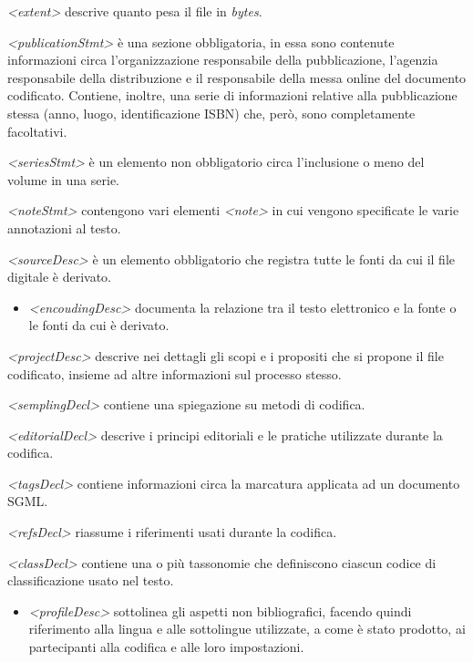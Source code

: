 \documentclass[
  b5paper,
  twoside,
  11pt,
  chapterprefix=false,
  bibliography=totocnumbered,
  listof=flat]{scrbook}
\providecommand{\tightlist}{%
  \setlength{\itemsep}{0pt}\setlength{\parskip}{0pt}}
\begin{document}
\emph{\textless extent\textgreater{}} descrive quanto pesa il file in \emph{bytes}.

\emph{\textless publicationStmt\textgreater{}} è una sezione obbligatoria, in essa sono contenute
informazioni circa l'organizzazione responsabile della pubblicazione,
l'agenzia responsabile della distribuzione e il responsabile della messa
online del documento codificato. Contiene, inoltre, una serie di
informazioni relative alla pubblicazione stessa (anno, luogo,
identificazione ISBN) che, però, sono completamente facoltativi.

\emph{\textless seriesStmt\textgreater{}} è un elemento non obbligatorio circa l'inclusione o
meno del volume in una serie.

\emph{\textless noteStmt\textgreater{}} contengono vari elementi \emph{\textless note\textgreater{}} in cui vengono
specificate le varie annotazioni al testo.

\emph{\textless sourceDesc\textgreater{}} è un elemento obbligatorio che registra tutte le fonti
da cui il file digitale è derivato.

\begin{itemize}
\tightlist
\item
  \emph{\textless encoudingDesc\textgreater{}} documenta la relazione tra il testo elettronico
  e la fonte o le fonti da cui è derivato.
\end{itemize}

\emph{\textless projectDesc\textgreater{}} descrive nei dettagli gli scopi e i propositi che si
propone il file codificato, insieme ad altre informazioni sul processo
stesso.

\emph{\textless semplingDecl\textgreater{}} contiene una spiegazione su metodi di codifica.

\emph{\textless editorialDecl\textgreater{}} descrive i principi editoriali e le pratiche
utilizzate durante la codifica.

\emph{\textless tagsDecl\textgreater{}} contiene informazioni circa la marcatura applicata ad un
documento SGML.

\emph{\textless refsDecl\textgreater{}} riassume i riferimenti usati durante la codifica.

\emph{\textless classDecl\textgreater{}} contiene una o più tassonomie che definiscono ciascun
codice di classificazione usato nel testo.

\begin{itemize}
\tightlist
\item
  \emph{\textless profileDesc\textgreater{}} sottolinea gli aspetti non bibliografici, facendo
  quindi riferimento alla lingua e alle sottolingue utilizzate, a come
  è stato prodotto, ai partecipanti alla codifica e alle loro
  impostazioni.
\end{itemize}
\end{document}
